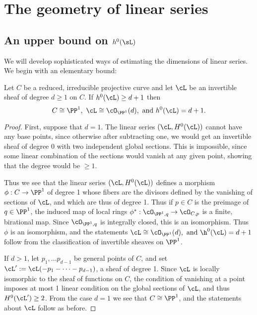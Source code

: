 \section{The geometry of linear series}

\subsection{An upper bound on $h^0(\sL)$}

We will develop sophisticated ways of estimating the dimensions of linear series. We begin with an elementary bound:

\begin{theorem}\label{characterization of P1}
Let $C$ be a reduced, irreducible projective curve and let $\cL$ be an invertible sheaf of degree $d\geq 1$ on $C$. If $h^0(\cL) \geq d+1$ then
$$C \cong \PP^1,\ \cL \cong \cO_{\PP^1}(d), \hbox{ and  } h^0(\cL) = d+1.
$$
\end{theorem}

\begin{proof}
First, suppose that $d=1$. The linear series $(\cL, H^0(\cL))$ cannot have any base points, since
otherwise after subtracting one, we would get an invertible sheaf of degree $0$ with two independent global sections. This is impossible, since some linear combination of the sections would vanish at any given point, showing that the degree would be
$\geq 1$.

Thus we see that the linear series $(\cL, H^0(\cL))$ defines a morphism $\phi: C\to \PP^1$ of degree 1 whose fibers are the divisors defined by
the vanishing of sections of $\cL$, and which are thus of degree 1. Thus if $p\in C$ is the preimage of $q\in \PP^1$, the induced map of local rings
$\phi^*:\cO_{\PP^1, q} \to \cO_{C, p}$ is a finite, birational map. Since $\cO_{\PP^1, q}$ is integrally closed, this is an isomorphism. Thus 
$\phi$ is an isomorphism, and the statements $\cL \cong \cO_{\PP^1}(d), \hbox{ and  } \h^0(\cL) = d+1$ follow from the classification of invertible sheaves on $\PP^1$. 

If $d>1$, let $p_1,\dots p_{d-1}$ be general points of $C$, and set $\cL':=\cL(-p_1-\cdots-p_{d-1})$, a sheaf of degree 1.
 Since $\cL$ is locally isomorphic to the sheaf of functions on $C$, the condition of vanishing at a point imposes at most 1 linear condition on 
the global sections of $\cL$, and thus $H^0(\cL') \geq 2$. From the case $d=1$ we see that $C\cong \PP^1$, and the statements
about $\cL$ follow as before.
 \end{proof}


